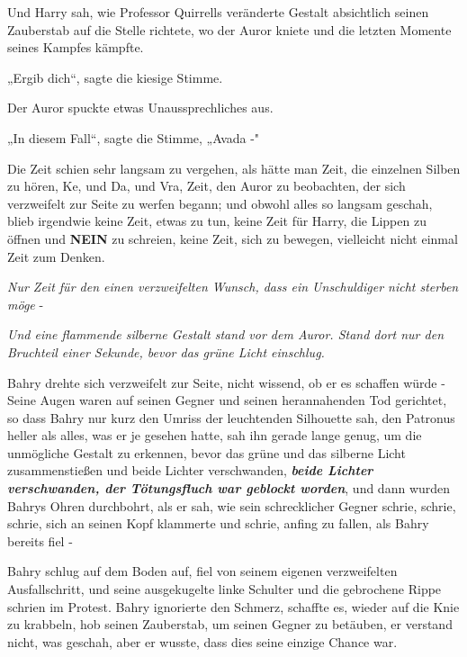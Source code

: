 {Und Harry sah, wie Professor Quirrells veränderte Gestalt absichtlich seinen Zauberstab auf die Stelle richtete, wo der Auror kniete und die letzten Momente seines Kampfes kämpfte.

„Ergib dich“, sagte die kiesige Stimme.

Der Auror spuckte etwas Unaussprechliches aus.

„In diesem Fall“, sagte die Stimme, „Avada -"

Die Zeit schien sehr langsam zu vergehen, als hätte man Zeit, die einzelnen Silben zu hören, Ke, und Da, und Vra, Zeit, den Auror zu beobachten, der sich verzweifelt zur Seite zu werfen begann; und obwohl alles so langsam geschah, blieb irgendwie keine Zeit, etwas zu tun, keine Zeit für Harry, die Lippen zu öffnen und \textbf{NEIN} zu schreien, keine Zeit, sich zu bewegen, vielleicht nicht einmal Zeit zum Denken.

\emph{Nur Zeit für den einen verzweifelten Wunsch, dass ein Unschuldiger nicht sterben möge} -

\emph{Und eine flammende silberne Gestalt stand vor dem Auror. Stand dort nur den Bruchteil einer Sekunde, bevor das grüne Licht einschlug.}

Bahry drehte sich verzweifelt zur Seite, nicht wissend, ob er es schaffen würde - Seine Augen waren auf seinen Gegner und seinen herannahenden Tod gerichtet, so dass Bahry nur kurz den Umriss der leuchtenden Silhouette sah, den Patronus heller als alles, was er je gesehen hatte, sah ihn gerade lange genug, um die unmögliche Gestalt zu erkennen, bevor das grüne und das silberne Licht zusammenstießen und beide Lichter verschwanden, \textbf{\emph{beide Lichter verschwanden, der Tötungsfluch war geblockt worden}}, und dann wurden Bahrys Ohren durchbohrt, als er sah, wie sein schrecklicher Gegner schrie, schrie, schrie, sich an seinen Kopf klammerte und schrie, anfing zu fallen, als Bahry bereits fiel -

Bahry schlug auf dem Boden auf, fiel von seinem eigenen verzweifelten Ausfallschritt, und seine ausgekugelte linke Schulter und die gebrochene Rippe schrien im Protest. Bahry ignorierte den Schmerz, schaffte es, wieder auf die Knie zu krabbeln, hob seinen Zauberstab, um seinen Gegner zu betäuben, er verstand nicht, was geschah, aber er wusste, dass dies seine einzige Chance war.

}
